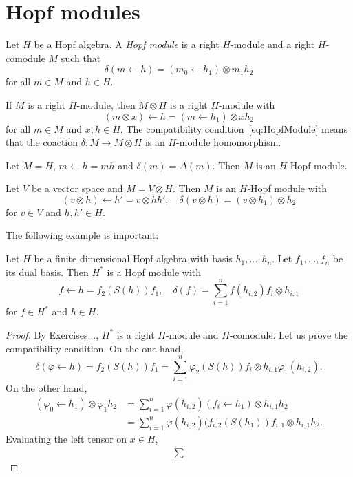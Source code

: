 \section{Hopf modules}

\begin{definition}
  Let $H$ be a Hopf algebra. A \emph{Hopf module}
  is a right $H$-module and a right $H$-comodule $M$
  such that 
  \begin{equation}
    \label{eq:HopfModule}
    \delta(m\leftarrow h)=(m_0\leftarrow h_1)\otimes m_1h_2
  \end{equation}
  for all $m\in M$ and $h\in H$. 
\end{definition}

If $M$ is a right $H$-module, then $M\otimes H$ is a right $H$-module with
\[
  (m\otimes x)\leftarrow h=(m\leftarrow h_1)\otimes xh_2
\]
for all $m\in M$ and $x,h\in H$. 
The compatibility
condition~\eqref{eq:HopfModule} means that the coaction $\delta\colon M\to
M\otimes H$ is an $H$-module homomorphism. 

\begin{example}
  Let $M=H$, $m\leftarrow h=mh$ and $\delta(m)=\Delta(m)$. 
  Then $M$ is an $H$-Hopf module. 
\end{example}

\begin{example}
  Let $V$ be a vector space and $M=V\otimes H$. Then $M$ 
  is an $H$-Hopf module with 
  \[
    (v\otimes h)\leftarrow h'=v\otimes hh',\quad 
    \delta(v\otimes h)=(v\otimes h_1)\otimes h_2
  \] 
  for $v\in V$ and $h,h'\in H$. 
\end{example}

The following example is important:

\begin{lemma}
  \label{lem:LarsonSweedler}
  Let $H$ be a finite dimensional Hopf algebra with basis $h_1,\dots,h_n$.
  Let $f_1,\dots,f_n$ be its dual basis. 
  Then $H^*$ is a Hopf
  module with 
  \[
    f\leftarrow h=f_2(S(h))f_1,\quad 
  \delta(f)=\sum_{i=1}^n f(h_{i,2})f_i\otimes h_{i,1}
  \]
  for $f\in H^*$ and $h\in H$. 
\end{lemma}

\begin{proof}
  By Exercises..., $H^*$ is a right $H$-module
  and $H$-comodule. Let us prove the compatibility condition. On the one 
  hand, 
  \[
  \delta(\varphi\leftarrow h) = f_2(S(h))f_1 = 
  \sum_{i=1}^n\varphi_2(S(h))f_i\otimes h_{i,1}\varphi_1(h_{i,2}).
  \]
  On the other hand, 
  \begin{align*}
    (\varphi_0\leftarrow h_1)\otimes \varphi_1h_2 
    &=\sum_{i=1}^n\varphi(h_{i,2})(f_i\leftarrow h_1)\otimes h_{i,1}h_2\\
    &=\sum_{i=1}^n\varphi(h_{i,2})(f_{i,2}(S(h_1))f_{i,1}\otimes h_{i,1}h_2.
  \end{align*}
  Evaluating the left tensor on $x\in H$, 
  \begin{align*}
    \sum
  \end{align*}
\end{proof}


